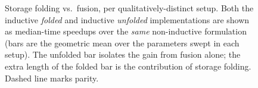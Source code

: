 \begin{figure}[t]
  \caption{Storage folding vs.\ fusion, per qualitatively-distinct setup. Both the
    inductive \emph{folded} and inductive \emph{unfolded} implementations are shown
    as median-time speedups over the \emph{same} non-inductive formulation (bars are
    the geometric mean over the parameters swept in each setup). The unfolded bar
    isolates the gain from fusion alone; the extra length of the folded bar is the
    contribution of storage folding. Dashed line marks parity.}
  \label{fig:combined-setups}
\end{figure}
